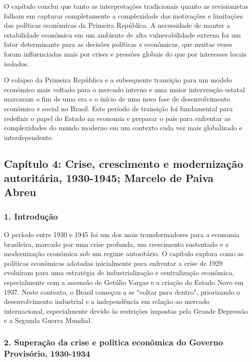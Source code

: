 \documentclass[a4paper,12pt]{article}[abntex2]
\begin{document}
O capítulo conclui que tanto as interpretações tradicionais quanto as revisionistas falham em capturar completamente a complexidade das motivações e limitações das políticas econômicas da Primeira República. A necessidade de manter a estabilidade econômica em um ambiente de alta vulnerabilidade externa foi um fator determinante para as decisões políticas e econômicas, que muitas vezes foram influenciadas mais por crises e pressões globais do que por interesses locais isolados.

O colapso da Primeira República e a subsequente transição para um modelo econômico mais voltado para o mercado interno e uma maior intervenção estatal marcaram o fim de uma era e o início de uma nova fase de desenvolvimento econômico e social no Brasil. Este período de transição foi fundamental para redefinir o papel do Estado na economia e preparar o país para enfrentar as complexidades do mundo moderno em um contexto cada vez mais globalizado e interdependente.

\newpage
\subsection{\textbf{Capítulo 4: Crise, crescimento e modernização autoritária, 1930-1945; Marcelo de Paiva Abreu}}

\subsubsection{\textbf{1. Introdução}}

O período entre 1930 e 1945 foi um dos mais transformadores para a economia brasileira, marcado por uma crise profunda, um crescimento sustentado e a modernização econômica sob um regime autoritário. O capítulo explora como as políticas econômicas adotadas inicialmente para enfrentar a crise de 1929 evoluíram para uma estratégia de industrialização e centralização econômica, especialmente com a ascensão de Getúlio Vargas e a criação do Estado Novo em 1937. Neste contexto, o Brasil começou a se "voltar para dentro", priorizando o desenvolvimento industrial e a independência em relação ao mercado internacional, especialmente devido às restrições impostas pela Grande Depressão e a Segunda Guerra Mundial.

\subsubsection{\textbf{2. Superação da crise e política econômica do Governo Provisório, 1930-1934}}
\end{document}
